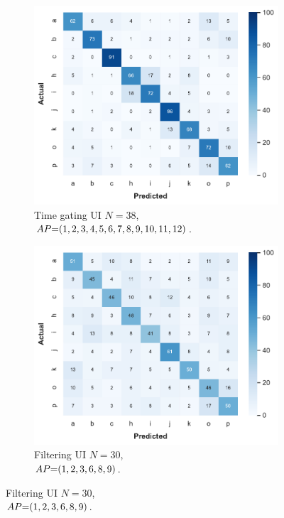 \begin{figure}[!b]
    \begin{subfigure}{.49\textwidth}
        \centering
        \includegraphics[width=.99\linewidth]{Figures/RadarExperiments/Datasets/ThroughMaterials/Wood/confusion-timegating-ui.pdf}  
        \vspace{-5pt}
        \captionsetup{width=.99\linewidth}
        \caption{Time gating UI $N{=}38$, \\ $\splitatcommas{AP{=}(1, 2, 3, 4, 5, 6, 7, 8, 9, 10, 11, 12)}$.}
        \label{fig:radar-experiments:through-materials:wood-confusion:timegating-ui}
    \end{subfigure}
    \begin{subfigure}{.49\textwidth}
        \centering
        \includegraphics[width=.99\linewidth]{Figures/RadarExperiments/Datasets/ThroughMaterials/Wood/confusion-filtering-ui.pdf}
        \vspace{-5pt}
        \captionsetup{width=.99\linewidth}
        \caption{Filtering UI $N{=}30$, \\ $\splitatcommas{AP{=}(1, 2, 3, 6, 8, 9)}$.}
        \label{fig:radar-experiments:through-materials:wood-confusion:filtering-ui}
    \end{subfigure}
    

\end{figure}
